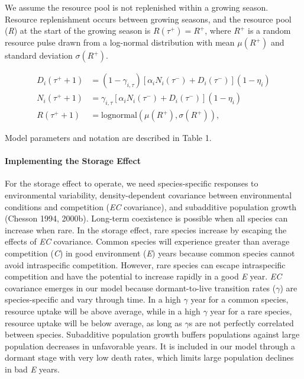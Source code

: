 \documentclass[12pt,]{article}
\let\oldparagraph\paragraph
\renewcommand{\paragraph}[1]{\oldparagraph{#1}\mbox{}}
\begin{document}
We assume the resource pool is not replenished within a growing season.
Resource replenishment occurs between growing seasons, and the resource
pool (\emph{R}) at the start of the growing season is
\(R(\tau^+) = R^+\), where \(R^+\) is a random resource pulse drawn from
a log-normal distribution with mean \(\mu(R^+)\) and standard deviation
\(\sigma(R^+)\).
\vspace{-3em}

\begin{align}
  D_{i}(\tau^+ + 1) &= (1-\gamma_{i,\tau}) \left[\alpha_i N_{i}(\tau^-) + D_{i}(\tau^-) \right] (1-\eta_i) \\
  N_{i}(\tau^+ + 1) &= \gamma_{i,\tau} \left[\alpha_i N_{i}(\tau^-) + D_{i}(\tau^-) \right] (1-\eta_i) \\
  R(\tau^+ + 1) &= \text{lognormal}\left(\mu(R^+), \sigma(R^+) \right),
\end{align}\vspace{-3em}

\noindent {}
Model parameters and notation are described in Table 1.

\paragraph{Implementing the Storage
Effect}\label{implementing-the-storage-effect}

For the storage effect to operate, we need species-specific responses to
environmental variability, density-dependent covariance between
environmental conditions and competition (\emph{EC} covariance), and
subadditive population growth (Chesson 1994, 2000b). Long-term
coexistence is possible when all species can increase when rare. In the
storage effect, rare species increase by escaping the effects of
\emph{EC} covariance. Common species will experience greater than
average competition (\emph{C}) in good environment (\emph{E}) years
because common species cannot avoid intraspecific competition. However,
rare species can escape intraspecific competition and have the potential
to increase rapidly in a good \emph{E} year. \emph{EC} covariance
emerges in our model because dormant-to-live transition rates
(\(\gamma\)) are species-specific and vary through time. In a high
\(\gamma\) year for a common species, resource uptake will be above
average, while in a high \(\gamma\) year for a rare species, resource
uptake will be below average, as long as \(\gamma\)s are not perfectly
correlated between species. Subadditive population growth buffers
populations against large population decreases in unfavorable years. It
is included in our model through a dormant stage with very low death
rates, which limits large population declines in bad \emph{E} years.
\end{document}
